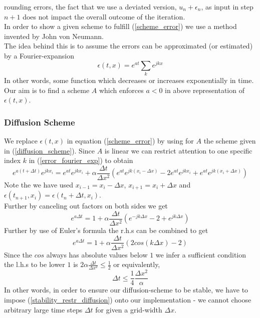 \documentclass[]{article}
\begin{document}
rounding errors, the fact that we use a deviated version, $u_{n}+\epsilon_{n}$, as input in
step $n+1$ does not impact the overall outcome of the iteration.\\
In order to show a given scheme to fulfill (\ref{scheme_error}) we use a method invented by John von Neumann.\\
The idea behind this is to assume the errors can be approximated (or estimated) by a Fourier-expansion
\begin{equation} \label{error_fourier_exp}
\epsilon(t,x)=e^{at}\sum_{k}e^{jkx}
\end{equation}
In other words, some function which decreases or increases exponentially in time. Our aim is to find a scheme $A$ which enforces $a<0$ in above representation of $\epsilon(t,x)$.\\

\subsubsection{Diffusion Scheme}
We replace $\epsilon(t,x)$ in equation (\ref{scheme_error}) by using for $A$ the scheme given in (\ref{diffusion_scheme}). Since $A$ is linear we can restrict attention to one specific index $k$ in (\ref{error_fourier_exp}) to obtain
\begin{equation*}
e^{a(t+\Delta t)}e^{jkx_{i}}=e^{at}e^{jkx_{i}}+\alpha\frac{\Delta t}{\Delta x^2}
\left(e^{at}e^{jk(x_{i}-\Delta x)} -2e^{at}e^{jkx_{i}}+e^{at}e^{jk(x_{i}+\Delta x)}\right)
\end{equation*}
Note the we have used $x_{i-1}=x_{i}-\Delta x$, $x_{i+1}=x_{i}+\Delta x$ and $\epsilon(t_{n+1}, x_{i})=\epsilon(t_{n}+\Delta t, x_{i})$.\\
Further by canceling out factors on both sides we get
\begin{equation*}
e^{a\Delta t}=1+\alpha\frac{\Delta t}{\Delta x^2}
\left(e^{-jk\Delta x} -2+e^{jk\Delta x}\right)
\end{equation*}
Further by use of Euler's formula the r.h.s can be combined to get
\begin{equation*}
e^{a\Delta t}=1+\alpha\frac{\Delta t}{\Delta x^2}
\left(2cos(k\Delta x) -2\right)
\end{equation*}
Since the $cos$ always has absolute values below $1$ we infer a sufficient condition the l.h.s to be lower $1$ is $2\alpha\frac{\Delta t}{\Delta x^2}\leq\frac{1}{2}$ or equivalently,
\begin{equation} \label{stability_restr_diffusion}
\Delta t\leq \frac{1}{4}\frac{\Delta x^2}{\alpha}
\end{equation}
In other words, in order to ensure our diffusion-scheme to be stable, we have to impose (\ref{stability_restr_diffusion}) onto our implementation - we cannot choose arbitrary large time steps $\Delta t$ for given a grid-width $\Delta x$.
\end{document}
